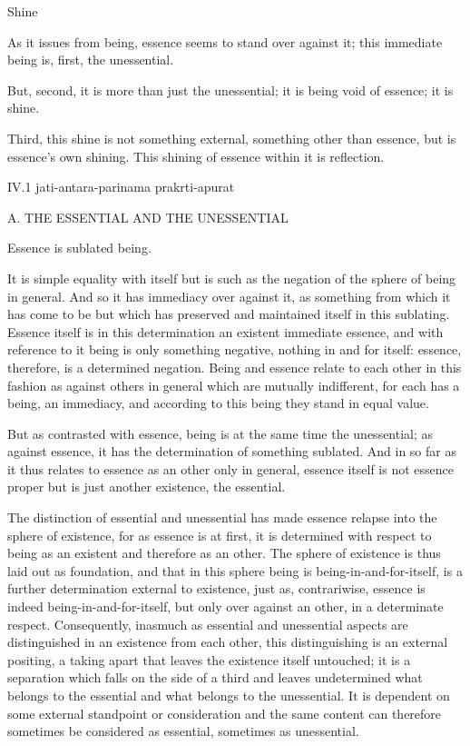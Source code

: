 Shine

As it issues from being, essence seems to stand over against it;
this immediate being is, first, the unessential.

But, second, it is more than just the unessential;
it is being void of essence; it is shine.

Third, this shine is not something external,
something other than essence, but is essence's own shining.
This shining of essence within it is reflection.

IV.1
jati-antara-parinama prakrti-apurat

A. THE ESSENTIAL AND THE UNESSENTIAL

Essence is sublated being.

It is simple equality with itself
but is such as the negation of
the sphere of being in general.
And so it has immediacy over against it,
as something from which it has come to be but which has
preserved and maintained itself in this sublating.
Essence itself is in this determination
an existent immediate essence,
and with reference to it
being is only something negative,
nothing in and for itself:
essence, therefore, is a determined negation.
Being and essence relate to each other in this fashion
as against others in general which are mutually indifferent,
for each has a being, an immediacy,
and according to this being they stand in equal value.

But as contrasted with essence,
being is at the same time the unessential;
as against essence, it has the determination of something sublated.
And in so far as it thus relates to essence
as an other only in general,
essence itself is not essence proper
but is just another existence, the essential.

The distinction of essential and unessential has
made essence relapse into the sphere of existence,
for as essence is at first,
it is determined with respect to being
as an existent and therefore as an other.
The sphere of existence is thus laid out as foundation,
and that in this sphere being is being-in-and-for-itself,
is a further determination external to existence,
just as, contrariwise, essence is indeed being-in-and-for-itself,
but only over against an other, in a determinate respect.
Consequently, inasmuch as essential and unessential aspects are
distinguished in an existence from each other,
this distinguishing is an external positing,
a taking apart that leaves the existence itself untouched;
it is a separation which falls on the side of
a third and leaves undetermined
what belongs to the essential
and what belongs to the unessential.
It is dependent on some external standpoint or consideration
and the same content can therefore sometimes be considered
as essential, sometimes as unessential.

